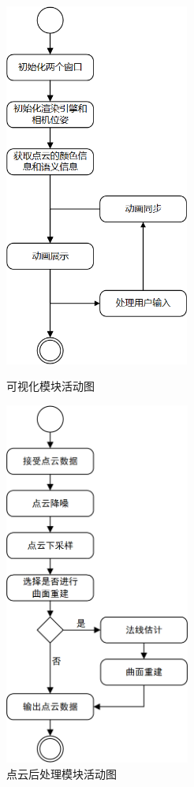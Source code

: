 \begin{figure}[htb]
	\centering
	\begin{minipage}[t]{0.45\linewidth}
		\centering
		\includegraphics[height=12cm,keepaspectratio]{figures/uml/activity5.png}
		\caption{可视化模块活动图}
		\label{fig:activity5}
	\end{minipage}
	\begin{minipage}[t]{0.45\linewidth}
		\centering
		\includegraphics[height=12cm,keepaspectratio]{figures/uml/activity6.png}
		\caption{点云后处理模块活动图}
		\label{fig:activity6}
	\end{minipage}
\end{figure}

